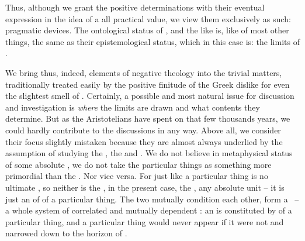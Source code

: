 

\pa Thus, although we grant the positive determinations with their eventual
expression in the idea of a  all practical value, we view them
exclusively as such: pragmatic devices. The ontological status of
,  and the like is, like of most other
things, the same as their epistemological status, which in this case is: the
limits of .

We bring thus, indeed, elements of negative theology into the trivial matters,
traditionally treated easily by the positive finitude of the Greek dislike for
even the slightest smell of .  Certainly, a possible and most
natural issue for discussion and investigation is {\em where} the 
limits are drawn and what  contents they determine. But as the
Aristotelians have spent on that few thousands years, we could hardly contribute
to the discussions in any way.  Above all, we consider their focus slightly
mistaken because they are almost always underlied by the 
assumption of studying the , the  and .
We do not believe in metaphysical status of some absolute , we
do not take the particular things as something more primordial than the \hoa.
Nor vice versa.  For just like a particular thing is no ultimate
, so neither is the \hoa, in the present case, the
,  any absolute unit --
it is just an  of  of a particular thing.  The two
mutually condition each other, form a \nexus\ -- a whole system of correlated
and mutually dependent : an  is constituted
by  of a particular thing, and a particular thing would never
appear if it were not  and narrowed down to the horizon of
.

